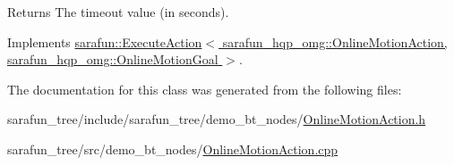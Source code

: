 \begin{DoxyReturn}{Returns}
The timeout value (in seconds). 
\end{DoxyReturn}


Implements \hyperlink{classsarafun_1_1ExecuteAction_aba6cfa8a8ce19e735eb6394424df6d17}{sarafun\-::\-Execute\-Action$<$ sarafun\-\_\-hqp\-\_\-omg\-::\-Online\-Motion\-Action, sarafun\-\_\-hqp\-\_\-omg\-::\-Online\-Motion\-Goal $>$}.



The documentation for this class was generated from the following files\-:\begin{DoxyCompactItemize}
\item 
sarafun\-\_\-tree/include/sarafun\-\_\-tree/demo\-\_\-bt\-\_\-nodes/\hyperlink{OnlineMotionAction_8h}{Online\-Motion\-Action.\-h}\item 
sarafun\-\_\-tree/src/demo\-\_\-bt\-\_\-nodes/\hyperlink{OnlineMotionAction_8cpp}{Online\-Motion\-Action.\-cpp}\end{DoxyCompactItemize}
